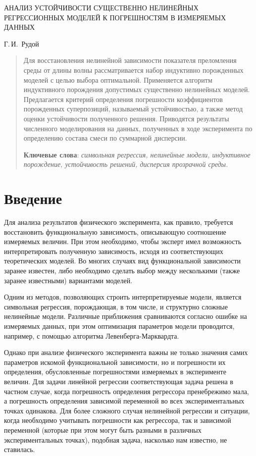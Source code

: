 \documentclass[11pt,a4paper]{article}
\theoremstyle{definition}
\begin{document}
\begin{center}
  АНАЛИЗ УСТОЙЧИВОСТИ СУЩЕСТВЕННО НЕЛИНЕЙНЫХ РЕГРЕССИОННЫХ МОДЕЛЕЙ К ПОГРЕШНОСТЯМ В ИЗМЕРЯЕМЫХ
  ДАННЫХ

  \bigskip
  Г.\,И.~Рудой
\end{center}

\begin{abstract}
  Для восстановления нелинейной зависимости показателя преломления среды от длины
  волны рассматривается набор индуктивно порожденных моделей с целью выбора оптимальной.
  Применяется алгоритм индуктивного порождения допустимых существенно
  нелинейных моделей. Предлагается критерий определения погрешности коэффициентов порожденных
  суперпозиций, называемый устойчивостью, а также метод оценки устойчивости полученного решения.
  Приводятся результаты численного моделирования на данных, полученных в ходе
  эксперимента по определению состава смеси по суммарной дисперсии.

  \bigskip
  \textbf{Ключевые слова}: \emph{символьная регрессия, нелинейные модели, индуктивное порождение,
	устойчивость решений, дисперсия прозрачной среды.}
\end{abstract}

\section*{Введение}

Для анализа результатов физического эксперимента, как правило, требуется
восстановить функциональную зависимость, описывающую соотношение измеряемых
величин. При этом необходимо, чтобы эксперт имел возможность интерпретировать
полученную зависимость, исходя из соответствующих теоретических моделей. Во
многих случаях вид функциональной зависимости заранее известен, либо необходимо
сделать выбор между несколькими (также заранее известными) вариантами моделей.

Одним из методов, позволяющих строить интерпретируемые модели, является
символьная регрессия\cite{davidson:2000:snrea,reference/ml/X10vc,StrijovW10,Strijov08InductMethods,Rudoy13},
порождающая, в том числе, и структурно сложные нелинейные модели. Различные
приближения сравниваются согласно ошибке на измеряемых данных, при этом оптимизация
параметров модели проводится, например, с помощью алгоритма Левенберга-Марквардта\cite{Marquardt1963Algorithm,more:78}.

Однако при анализе физического эксперимента важны не только значения самих
параметров искомой функциональной зависимости, но и погрешности их определения,
обусловленные погрешностями измеряемых в эксперименте величин. Для задачи
линейной регрессии соответствующая задача решена в частном случае, когда
погрешность определения регрессора пренебрежимо мала, а погрешность определения
зависимой переменной во всех экспериментальных точках одинакова\cite{Vatunin05}.
Для более сложного случая нелинейной регрессии и ситуации, когда необходимо
учитывать погрешности как регрессора, так и зависимой переменной (которые при
этом могут быть разными в различных экспериментальных точках), подобная задача,
насколько нам известно, не ставилась.
\end{document}
